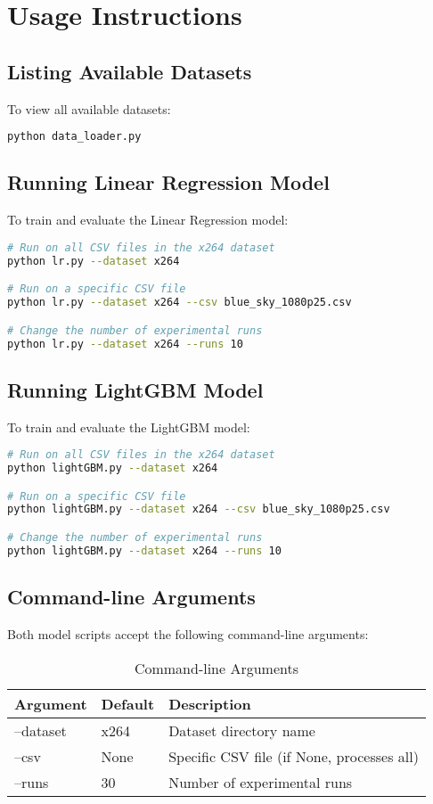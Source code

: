 \documentclass[10pt]{article}
\begin{document}
\section{Usage Instructions}

\subsection{Listing Available Datasets}
To view all available datasets:
\begin{lstlisting}[language=bash]
python data_loader.py
\end{lstlisting}

\subsection{Running Linear Regression Model}
To train and evaluate the Linear Regression model:

\begin{lstlisting}[language=bash]
# Run on all CSV files in the x264 dataset
python lr.py --dataset x264

# Run on a specific CSV file
python lr.py --dataset x264 --csv blue_sky_1080p25.csv

# Change the number of experimental runs
python lr.py --dataset x264 --runs 10
\end{lstlisting}

\subsection{Running LightGBM Model}
To train and evaluate the LightGBM model:

\begin{lstlisting}[language=bash]
# Run on all CSV files in the x264 dataset
python lightGBM.py --dataset x264

# Run on a specific CSV file
python lightGBM.py --dataset x264 --csv blue_sky_1080p25.csv

# Change the number of experimental runs
python lightGBM.py --dataset x264 --runs 10
\end{lstlisting}

\subsection{Command-line Arguments}
Both model scripts accept the following command-line arguments:

\begin{table}[h]
\centering
\caption{Command-line Arguments}
\begin{tabular}{lll}
\toprule
\textbf{Argument} & \textbf{Default} & \textbf{Description} \\
\midrule
--dataset & x264 & Dataset directory name \\
--csv & None & Specific CSV file (if None, processes all) \\
--runs & 30 & Number of experimental runs \\
\bottomrule
\end{tabular}
\end{table}
\end{document}
